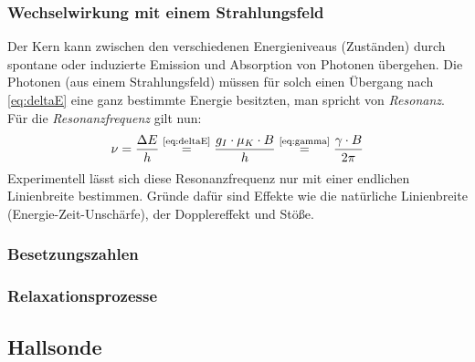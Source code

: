 \subsubsection{Wechselwirkung mit einem Strahlungsfeld}
Der Kern kann zwischen den verschiedenen Energieniveaus (Zuständen) durch spontane oder induzierte Emission und Absorption von Photonen übergehen. 
Die Photonen (aus einem Strahlungsfeld) müssen für solch einen Übergang nach \autoref{eq:deltaE} eine ganz bestimmte Energie besitzten, man spricht 
von \emph{Resonanz}. Für die \emph{Resonanzfrequenz} gilt nun:
\begin{equation}
  \label{eq:nu}
  \nu = \frac{\Delta E}{h} \refeq{eq:deltaE} \frac{g_I \cdot \mu_K \cdot B}{h} \refeq{eq:gamma} \frac{\gamma \cdot B}{2 \pi}
\end{equation}
Experimentell lässt sich diese Resonanzfrequenz nur mit einer endlichen Linienbreite bestimmen. Gründe dafür sind Effekte wie die natürliche 
Linienbreite (Energie-Zeit-Unschärfe), der Dopplereffekt und Stöße.

\subsubsection{Besetzungszahlen}

\subsubsection{Relaxationsprozesse}

\subsection{Hallsonde}